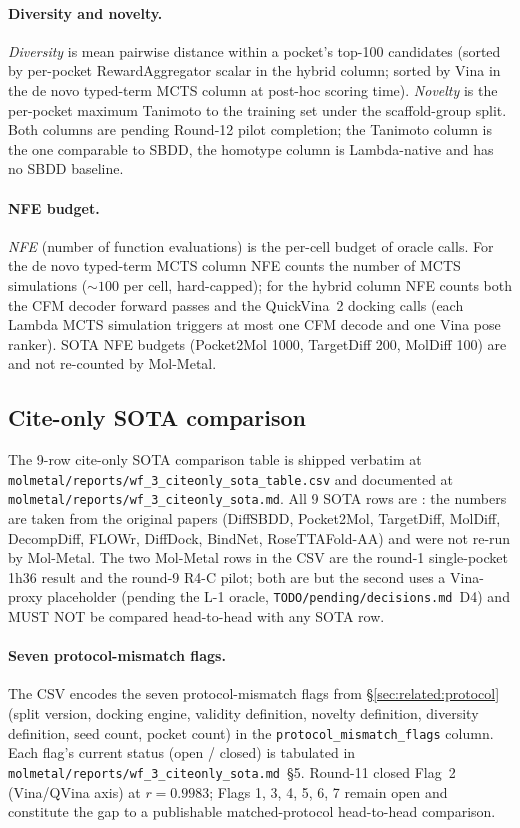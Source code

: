 \paragraph{Diversity and novelty.}
\emph{Diversity} is mean pairwise distance within a pocket's
top-100 candidates (sorted by per-pocket RewardAggregator scalar in
the hybrid column; sorted by Vina in the de novo typed-term MCTS column at
post-hoc scoring time). \emph{Novelty} is the per-pocket maximum
Tanimoto to the training set under the scaffold-group split. Both
columns are \DESIGN{} pending Round-12 pilot completion; the
Tanimoto column is the one comparable to SBDD, the homotype column
is Lambda-native and has no SBDD baseline.

\paragraph{NFE budget.}
\emph{NFE} (number of function evaluations) is the per-cell budget
of oracle calls. For the de novo typed-term MCTS column NFE counts the
number of MCTS simulations ($\sim\!100$ per cell, hard-capped);
for the hybrid column NFE counts both the CFM decoder forward
passes and the QuickVina~2 docking calls (each Lambda MCTS
simulation triggers at most one CFM decode and one Vina pose
ranker). SOTA NFE budgets (Pocket2Mol 1000, TargetDiff 200, MolDiff
100) are \CITEDONLY{} and not re-counted by Mol-Metal.

\subsection{Cite-only SOTA comparison}
\label{sec:evaluation:sota}

The 9-row cite-only SOTA comparison table is shipped verbatim at
\texttt{molmetal/reports/wf\_3\_citeonly\_sota\_table.csv} and
documented at \texttt{molmetal/reports/wf\_3\_citeonly\_sota.md}.
All 9 SOTA rows are \CITEDONLY{}: the numbers are taken from the
original papers (DiffSBDD, Pocket2Mol, TargetDiff, MolDiff,
DecompDiff, FLOWr, DiffDock, BindNet, RoseTTAFold-AA) and were
not re-run by Mol-Metal. The two Mol-Metal rows in the CSV are
the round-1 single-pocket 1h36 result and the round-9 R4-C pilot;
both are \MEASURED{} but the second uses a Vina-proxy placeholder
(pending the L-1 oracle, \texttt{TODO/pending/decisions.md}~D4)
and MUST NOT be compared head-to-head with any SOTA row.

\paragraph{Seven protocol-mismatch flags.}
The CSV encodes the seven protocol-mismatch flags from
\S\ref{sec:related:protocol} (split version, docking engine, validity
definition, novelty definition, diversity definition, seed count,
pocket count) in the \texttt{protocol\_mismatch\_flags} column.
Each flag's current status (open / closed) is tabulated in
\texttt{molmetal/reports/wf\_3\_citeonly\_sota.md}~\S5. Round-11
closed Flag~2 (Vina/QVina axis) at $r{=}0.9983$; Flags 1, 3, 4, 5,
6, 7 remain open and constitute the gap to a publishable
matched-protocol head-to-head comparison.

